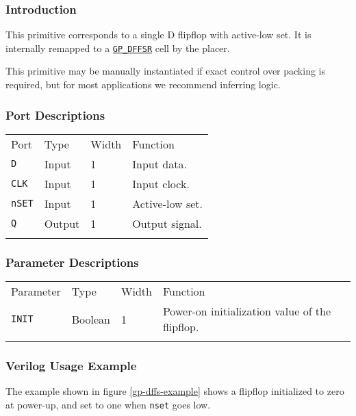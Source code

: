 \documentclass[11pt]{article}
\newcommand{\tokenstyle}[1]{\texttt{#1}}
\newcommand{\wirestyle}[1]{\texttt{#1}}
\newcommand{\whenstyle}[1]{{\fontseries{sb}\selectfont#1}}
\newcommand{\tokenref}[2]{\hyperref[#2]{\tokenstyle{#1}}}
\newcommand{\thinhline}{\Xhline{1\arrayrulewidth}}
\newcommand{\thickhline}{\Xhline{2.5\arrayrulewidth}}
\begin{document}
\subsubsection{Introduction}
This primitive corresponds to a single D flipflop with active-low set. It is internally remapped to a
\tokenref{GP\_DFFSR}{gp-dffsr} cell by the placer.

This primitive may be manually instantiated if exact control over packing is required, but for most applications we
recommend inferring logic.

\subsubsection{Port Descriptions}

\begin{tabularx}{\textwidth}{lllX}
\thinhline
\whenstyle{Port} & \whenstyle{Type} & \whenstyle{Width} & \whenstyle{Function} \\
\thickhline
\tokenstyle{D} & Input & 1 & Input data. \\
\thinhline
\tokenstyle{CLK} & Input & 1 & Input clock. \\
\thinhline
\tokenstyle{nSET} & Input & 1 & Active-low set. \\
\thinhline
\tokenstyle{Q} & Output & 1 & Output signal. \\
\thinhline
\end{tabularx}

\subsubsection{Parameter Descriptions}

\begin{tabularx}{\textwidth}{lllX}
\thinhline
\whenstyle{Parameter} & \whenstyle{Type} & \whenstyle{Width} & \whenstyle{Function} \\
\thickhline
\tokenstyle{INIT} & Boolean & 1 & Power-on initialization value of the flipflop. \\
\thinhline
\end{tabularx}

\subsubsection{Verilog Usage Example}

The example shown in figure \ref{gp-dffs-example} shows a flipflop initialized to zero at power-up, and set to one
when \wirestyle{nset} goes low.
\end{document}
